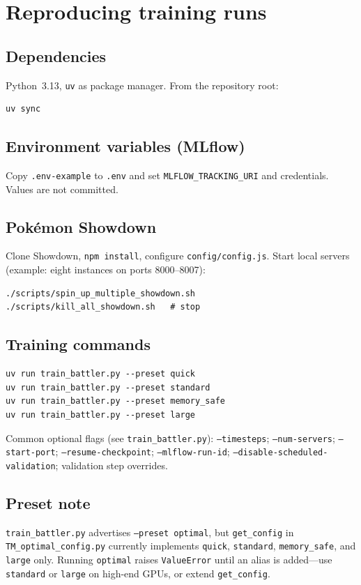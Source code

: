 \chapter{Reproducing training runs}

\section{Dependencies}
Python~3.13, \texttt{uv} as package manager. From the repository root:
\begin{verbatim}
uv sync
\end{verbatim}

\section{Environment variables (MLflow)}
Copy \texttt{.env-example} to \texttt{.env} and set \texttt{MLFLOW\_TRACKING\_URI} and credentials. Values are not committed.

\section{Pok\'{e}mon Showdown}
Clone Showdown, \texttt{npm install}, configure \texttt{config/config.js}. Start local servers (example: eight instances on ports 8000--8007):
\begin{verbatim}
./scripts/spin_up_multiple_showdown.sh
./scripts/kill_all_showdown.sh   # stop
\end{verbatim}

\section{Training commands}
\begin{verbatim}
uv run train_battler.py --preset quick
uv run train_battler.py --preset standard
uv run train_battler.py --preset memory_safe
uv run train_battler.py --preset large
\end{verbatim}
\noindent Common optional flags (see \texttt{train\_battler.py}): \texttt{--timesteps}; \texttt{--num-servers}; \texttt{--start-port}; \texttt{--resume-checkpoint}; \texttt{--mlflow-run-id}; \texttt{--disable-scheduled-validation}; validation step overrides.

\section{Preset note}
\texttt{train\_battler.py} advertises \texttt{--preset optimal}, but \texttt{get\_config} in \texttt{TM\_optimal\_config.py} currently implements \texttt{quick}, \texttt{standard}, \texttt{memory\_safe}, and \texttt{large} only. Running \texttt{optimal} raises \texttt{ValueError} until an alias is added---use \texttt{standard} or \texttt{large} on high-end GPUs, or extend \texttt{get\_config}.

